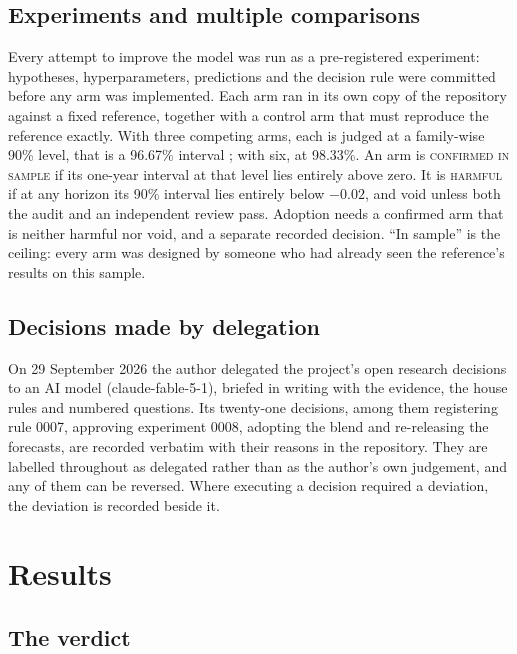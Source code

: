 \documentclass[11pt]{article}
\begin{document}
\subsection{Experiments and multiple comparisons}

Every attempt to improve the model was run as a pre-registered experiment: hypotheses, hyperparameters,
predictions and the decision rule were committed before any arm was implemented. Each arm ran in its own
copy of the repository against a fixed reference, together with a control arm that must reproduce the
reference exactly. With three competing arms, each is judged at a family-wise 90\% level, that is a
96.67\% interval \citep{dunn1961multiple}; with six, at 98.33\%. An arm is \textsc{confirmed in sample} if
its one-year interval at that level lies entirely above zero. It is \textsc{harmful} if at any horizon
its 90\% interval lies entirely below $-0.02$, and void unless both the audit and an independent review
pass. Adoption needs a confirmed arm that is neither harmful nor void, and a separate recorded decision.
``In sample'' is the ceiling: every arm was designed by someone who had already seen the reference's
results on this sample.

\subsection{Decisions made by delegation}\label{sec:delegation}

On 29 September 2026 the author delegated the project's open research decisions to an AI model
(claude-fable-5-1), briefed in writing with the evidence, the house rules and numbered questions. Its
twenty-one decisions, among them registering rule 0007, approving experiment 0008, adopting the blend and
re-releasing the forecasts, are recorded verbatim with their reasons in the repository. They are labelled
throughout as delegated rather than as the author's own judgement, and any of them can be reversed. Where
executing a decision required a deviation, the deviation is recorded beside it.

\section{Results}\label{sec:results}

\subsection{The verdict}
\end{document}
